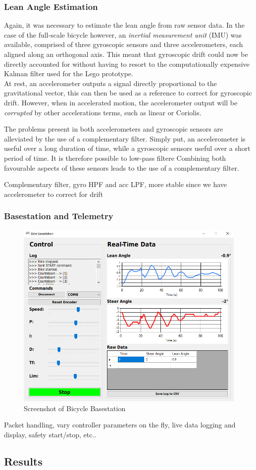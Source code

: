 \subsubsection{Lean Angle Estimation}
Again, it was necessary to estimate the lean angle from raw sensor data. In the case of the full-scale bicycle however, an \textit{inertial measurement unit} (IMU) was available, comprised of three gyroscopic sensors and three accelerometers, each aligned along an orthogonal axis. This meant that gyroscopic drift could now be directly accounted for without having to resort to the computationally expensive Kalman filter used for the Lego prototype.\\

At rest, an accelerometer outputs a signal directly proportional to the gravitational vector, this can then be used as a reference to correct for gyroscopic drift. However, when in accelerated motion, the accelerometer output will be \textit{corrupted} by other accelerations terms, such as linear or Coriolis.

The problems present in both accelerometers and gyroscopic sensors are alleviated by the use of a complementary filter. Simply put, an accelerometer is useful over a long duration of time, while a gyroscopic sensors useful over a short period of time. It is therefore possible to low-pass filtere Combining both favourable aspects of these sensors leads to the use of a complementary filter. 

Complementary filter, gyro HPF and acc LPF, more stable since we have accelerometer to correct for drift

\subsubsection{Basestation and Telemetry}

\begin{figure}[h]
\centering
\includegraphics[scale=0.5]{Basestation}
\caption{Screenshot of Bicycle Basestation}
\label{fig:basestation}
\end{figure}

Packet handling, vary controller parameters on the fly, live data logging and display, safety start/stop, etc..

\subsection{Results}